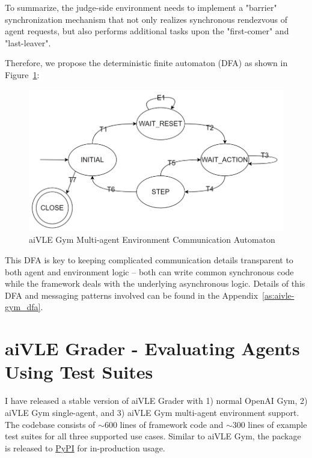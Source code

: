 To summarize, the judge-side environment needs to implement a "barrier" synchronization mechanism that not only realizes synchronous rendezvous of agent requests, but also performs additional tasks upon the "first-comer" and "last-leaver". 

Therefore, we propose the deterministic finite automaton (DFA) as shown in Figure~\ref{fig:aivle-gym-multi-dfa}:
\begin{figure}[H]
    \centering
    \includegraphics{images/aivle-gym-multi-dfa.png}
    \caption{aiVLE Gym Multi-agent Environment Communication Automaton}
    \label{fig:aivle-gym-multi-dfa}
\end{figure}

This DFA is key to keeping complicated communication details transparent to both agent and environment logic – both can write common synchronous code while the framework deals with the underlying asynchronous logic. Details of this DFA and messaging patterns involved can be found in the Appendix~\ref{as:aivle-gym_dfa}.

\section{aiVLE Grader - Evaluating Agents Using Test Suites}
\label{ch:aivle-grader}
I have released a stable version of aiVLE Grader with 1) normal OpenAI Gym, 2) aiVLE Gym single-agent, and 3) aiVLE Gym multi-agent environment support. The codebase consists of $\sim$600 lines of framework code and $\sim$300 lines of example test suites for all three supported use cases. Similar to aiVLE Gym, the package is released to \href{https://test.pypi.org/project/aivle-grader/}{PyPI} for in-production usage.

